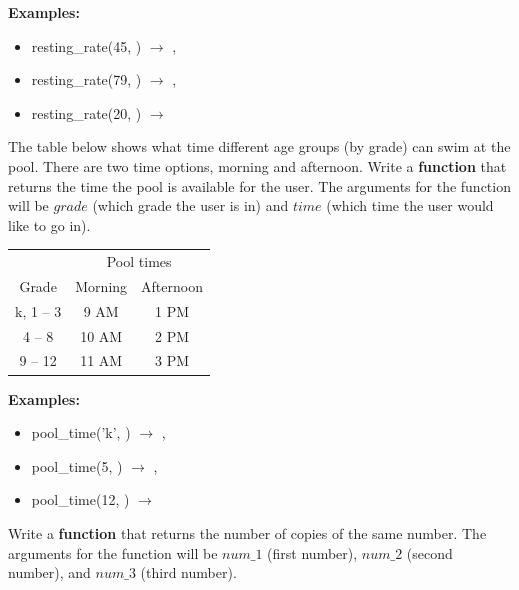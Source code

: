 	\textbf{Examples:}
	\begin{itemize}
		\item  resting\_rate(45, ) $\rightarrow$ , 
		\item  resting\_rate(79, ) $\rightarrow$ , 
		\item  resting\_rate(20, ) $\rightarrow$  
	\end{itemize}


	\item 
		The table below shows what time different age groups (by grade) can swim at the pool.  There 
		are two time options, morning and afternoon.  Write a \textbf{function} that returns the time 
		the pool is available for the user. The arguments for the function will be $grade$ (which grade the user is in) 
		and $time$ (which time the user would like to go in).
	\begin{center}
		\begin{minipage}{.45\textwidth}
			\begin{tabular}{c|cc}
				& \multicolumn{2}{c}{Pool times}\\
				Grade 		& Morning 	& Afternoon \\ \hline
				k, 1 -- 3 	& 9 AM 		& 1 PM\\
				4 -- 8 		& 10 AM 	& 2 PM\\
				9 -- 12 	& 11 AM 	& 3 PM \\
			\end{tabular}
		\end{minipage}
	\end{center}

	\textbf{Examples:}
	\begin{itemize}
		\item  pool\_time('k', ) $\rightarrow$ , 
		\item  pool\_time(5, ) $\rightarrow$ , 
		\item  pool\_time(12, ) $\rightarrow$ 
	\end{itemize}


	\item 
		Write a \textbf{function} that returns the number of copies of the same number. The arguments for the function will be $num\_1$ (first number), 					$num\_2$ (second number), and $num\_3$ (third number).\\

